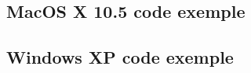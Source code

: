 \documentclass[11pt]{report}
\begin{document}
    \subsection{MacOS X 10.5 code exemple}
    \subsection{Windows XP code exemple}
\end{document}
